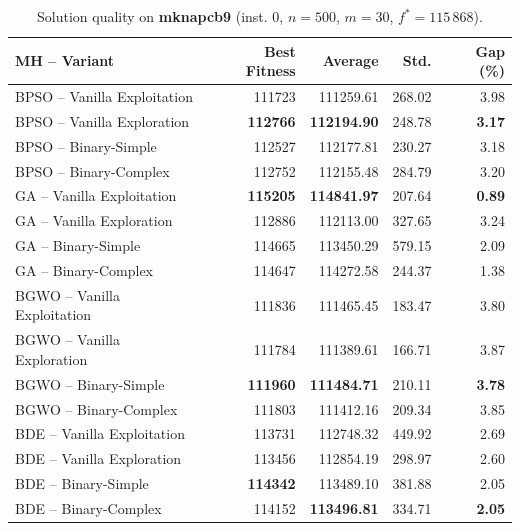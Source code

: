 \begin{table}[htbp]
  \centering
  \small
  \caption{Solution quality on \textbf{mknapcb9} (inst. 0, $n=500$, $m=30$, $f^*=115\,868$).}
  \label{tab:calidad_mknapcb9_0}
  \begin{tabular}{lrrrr}
    \toprule
    \textbf{MH -- Variant} &
    \textbf{Best Fitness} &
    \textbf{Average} &
    \textbf{Std.} &
    \textbf{Gap (\%)} \\
    \midrule
    BPSO -- Vanilla Exploitation &         111723 &        111259.61 & 268.02 &         3.98 \\
    BPSO -- Vanilla Exploration  & \textbf{112766} & \textbf{112194.90} & 248.78 & \textbf{3.17} \\
    BPSO -- Binary-Simple        &         112527 &        112177.81 & 230.27 &         3.18 \\
    BPSO -- Binary-Complex       &         112752 &        112155.48 & 284.79 &         3.20 \\
    \midrule
    GA -- Vanilla Exploitation   & \textbf{115205} & \textbf{114841.97} & 207.64 & \textbf{0.89} \\
    GA -- Vanilla Exploration    &         112886 &        112113.00 & 327.65 &         3.24 \\
    GA -- Binary-Simple          &         114665 &        113450.29 & 579.15 &         2.09 \\
    GA -- Binary-Complex         &         114647 &        114272.58 & 244.37 &         1.38 \\
    \midrule
    BGWO -- Vanilla Exploitation &         111836 &        111465.45 & 183.47 &         3.80 \\
    BGWO -- Vanilla Exploration  &         111784 &        111389.61 & 166.71 &         3.87 \\
    BGWO -- Binary-Simple        & \textbf{111960} & \textbf{111484.71} & 210.11 & \textbf{3.78} \\
    BGWO -- Binary-Complex       &         111803 &        111412.16 & 209.34 &         3.85 \\
    \midrule
    BDE -- Vanilla Exploitation  &         113731 &        112748.32 & 449.92 &         2.69 \\
    BDE -- Vanilla Exploration   &         113456 &        112854.19 & 298.97 &         2.60 \\
    BDE -- Binary-Simple         & \textbf{114342} &        113489.10 & 381.88 &         2.05 \\
    BDE -- Binary-Complex        &         114152 & \textbf{113496.81} & 334.71 & \textbf{2.05} \\
    \bottomrule
  \end{tabular}
\end{table}
